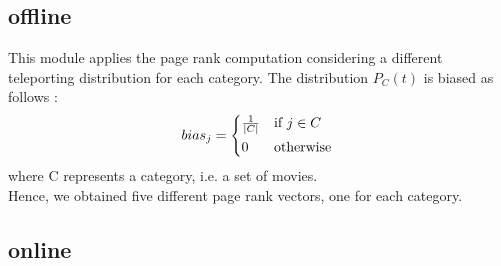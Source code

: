 \documentclass[11pt]{article}
\begin{document}
\subsection{offline}
This module applies the page rank computation considering a different teleporting distribution for each category. The
distribution $P_{C}(t)$ is biased as follows :
\begin{equation}
    bias_{j} =
    \begin{cases*}
      \frac{1}{|C|} & if $j \in C$ \\
      0        & otherwise
    \end{cases*}
  \end{equation}
where C represents a category, i.e. a set of movies.\\
Hence, we obtained five different page rank vectors, one for each category.

\subsection{online}
\end{document}
